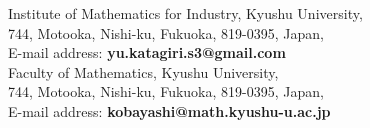 \documentclass[11pt]{amsart}
\theoremstyle{definition}
\begin{document}
\vspace{10pt}


\noindent
Institute of Mathematics for Industry, Kyushu University,\\
744, Motooka, Nishi-ku, Fukuoka, 819-0395, Japan,\\
E-mail address: \textbf{yu.katagiri.s3@gmail.com}\\

\noindent
Faculty of Mathematics, Kyushu University,\\
744, Motooka, Nishi-ku, Fukuoka, 819-0395, Japan,\\
E-mail address: \textbf{kobayashi@math.kyushu-u.ac.jp}
\end{document}

